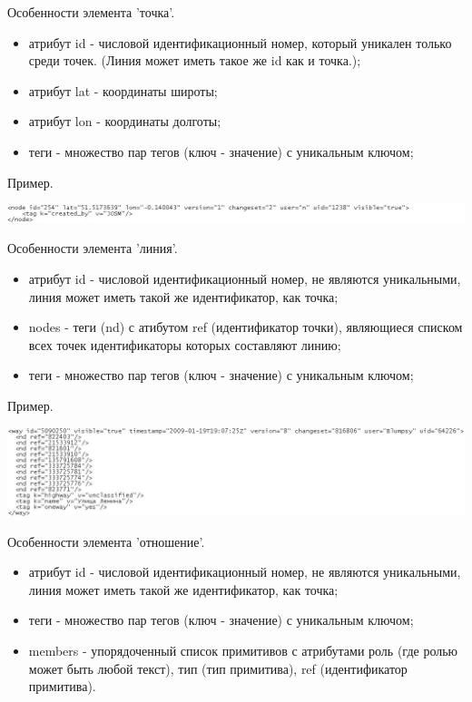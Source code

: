 \documentclass[12pt,a4paper,oneside]{article} %
\begin{document}
Особенности элемента 'точка'.

\begin{itemize}
\item атрибут id - числовой идентификационный номер, который уникален только среди точек. (Линия может иметь такое же id как и точка.);
\item атрибут lat - координаты широты;
\item атрибут lon - координаты долготы;
\item теги - множество пар тегов (ключ - значение) с уникальным ключом;
\end{itemize}

Пример.

\includegraphics[width=1.2\linewidth]{node}

Особенности элемента 'линия'.

\begin{itemize}
\item атрибут id - числовой идентификационный номер, не являются уникальными, линия может иметь такой же идентификатор, как точка;
\item nodes - теги (nd) с атибутом ref (идентификатор точки), являющиеся списком всех точек идентификаторы которых составляют линию;
\item теги - множество пар тегов (ключ - значение) с уникальным ключом;
\end{itemize}

Пример.

\includegraphics[width=1\linewidth]{way}

Особенности элемента 'отношение'.
\begin{itemize}
\item атрибут id - числовой идентификационный номер, не являются уникальными, линия может иметь такой же идентификатор, как точка;
\item теги - множество пар тегов (ключ - значение) с уникальным ключом;
\item members - упорядоченный список примитивов с атрибутами роль (где ролью может быть любой текст), тип (тип примитива), ref (идентификатор примитива).
\end{itemize}
\end{document}
